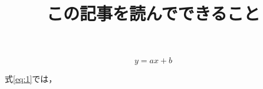 \documentclass{ujarticle}
\title{この記事を読んでできること}
\date{}
\begin{document}
\maketitle

\begin{equation}
  \label{eq:1}
  y = ax + b
\end{equation}

式\ref{eq:1}では，
\end{document}
